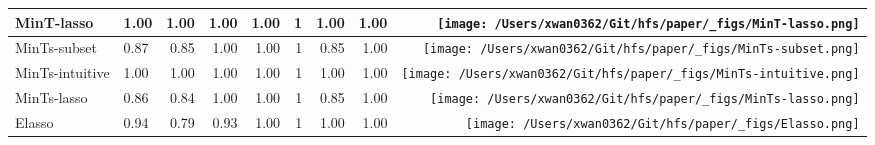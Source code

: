 \documentclass[11pt,a4paper,]{article}
\begin{document}
\begin{table}[!h]
{\begin{tabular}{llrrrrrr>{}r}
MinT-lasso & 1.00 & 1.00 & 1.00 & 1.00 & 1 & 1.00 & 1.00 & \texttt{[image: /Users/xwan0362/Git/hfs/paper/\_figs/MinT-lasso.png]}\\
\midrule
MinTs-subset & 0.87 & 0.85 & 1.00 & 1.00 & 1 & 0.85 & 1.00 & \texttt{[image: /Users/xwan0362/Git/hfs/paper/\_figs/MinTs-subset.png]}\\
MinTs-intuitive & 1.00 & 1.00 & 1.00 & 1.00 & 1 & 1.00 & 1.00 & \texttt{[image: /Users/xwan0362/Git/hfs/paper/\_figs/MinTs-intuitive.png]}\\
MinTs-lasso & 0.86 & 0.84 & 1.00 & 1.00 & 1 & 0.85 & 1.00 & \texttt{[image: /Users/xwan0362/Git/hfs/paper/\_figs/MinTs-lasso.png]}\\
\midrule
Elasso & 0.94 & 0.79 & 0.93 & 1.00 & 1 & 1.00 & 1.00 & \texttt{[image: /Users/xwan0362/Git/hfs/paper/\_figs/Elasso.png]}\\
\bottomrule
\end{tabular}}
\end{table}
\end{document}
